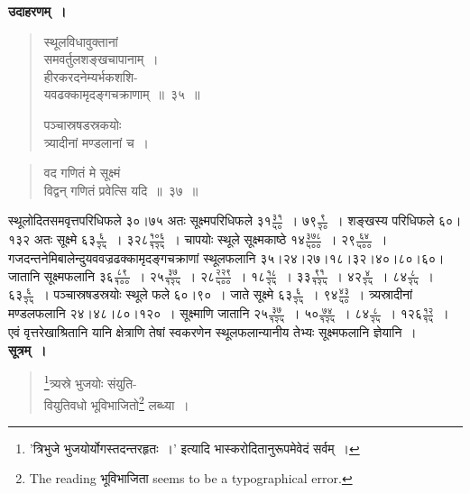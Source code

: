 \documentclass[11pt, openany]{book}
\begin{document}
 \textbf{उदाहरणम्~।} 
\begin{quote}
    \bqt 
     स्थूलविधावुक्तानां \\
     समवर्तुलशङ्खचापानाम्~।\\
हीरकरदनेम्यर्भकशशि-\\
यवढक्कामृदङ्गचक्राणाम्~॥~३५~॥ 
\vspace{2mm}

 पञ्चास्रषडस्रकयोः \\
 त्र्यादीनां मण्डलानां च~।
\end{quote}

\newpage%
\begin{quote}
    \bqt 
वद गणितं मे सूक्ष्मं \\
विद्वन् गणितं प्रवेत्सि यदि~॥~३७~॥ 
\end{quote}

स्थूलोदितसमवृत्तपरिधिफले ३०।७५ अतः सूक्ष्मपरिधिफले $\mbox{३१}\frac{\mbox{३१}}{\mbox{५०}}$~। 
$\mbox{७९}\frac{\mbox{९}}{\mbox{२०}}$~। शङ्खस्य परिधिफले ६०।१३२ अतः
सूक्ष्मे $\mbox{६३}\frac{\mbox{६}}{\mbox{२५}}$~। 
$\mbox{३२८}\frac{\mbox{१०६}}{\mbox{१२५}}$~। चापयोः स्थूले सूक्ष्मकाष्ठे $\mbox{१४}\frac{\mbox{३७८}}{\mbox{५००}}$~। $\mbox{२९}\frac{\mbox{६४}}{\mbox{५००}}$~। गजदन्तनेमिबालेन्दुयववज्रढक्कामृदङ्गचक्राणां स्थूलफलानि ३५।२४।२७।१८।३२।४०।८०।६०। जातानि सूक्ष्मफलानि $\mbox{३६}\frac{\mbox{८९}}{\mbox{१००}}$~। $\mbox{२५}\frac{\mbox{३७}}{\mbox{१२५}}$~। $\mbox{२८}\frac{\mbox{२२९}}{\mbox{५००}}$~। $\mbox{१८}\frac{\mbox{१८}}{\mbox{२५}}$~।
$\mbox{३३}\frac{\mbox{९१}}{\mbox{१२५}}$~। $\mbox{४२}\frac{\mbox{४}}{\mbox{२५}}$~। $\mbox{८४}\frac{\mbox{८}}{\mbox{२५}}$~। $\mbox{६३}\frac{\mbox{६}}{\mbox{२५}}$~।
पञ्चास्रषडस्रयोः स्थूले फले ६०।९०~। जाते सूक्ष्मे $\mbox{६३}\frac{\mbox{६}}{\mbox{२५}}$~। $\mbox{९४}\frac{\mbox{४३}}{\mbox{५०}}$~।
त्र्यस्रादीनां मण्डलफलानि २४।४८।८०।१२०~। सूक्ष्माणि जातानि $\mbox{२५}\frac{\mbox{३७}}{\mbox{१२५}}$~।
$\mbox{५०}\frac{\mbox{७४}}{\mbox{१२५}}$~। $\mbox{८४}\frac{\mbox{८}}{\mbox{२५}}$~। $\mbox{१२६}\frac{\mbox{१२}}{\mbox{१५}}$~। एवं वृत्तरेखाश्रितानि यानि क्षेत्राणि तेषां स्वकरणेन स्थूलफलान्यानीय
तेभ्यः सूक्ष्मफलानि ज्ञेयानि~।\\

\setcounter{footnote}{0}
 \textbf{सूत्रम्~।} 
\begin{quote}
    \bs 
 \footnote{'{\color{violet}त्रिभुजे भुजयोर्योगस्तदन्तरहृतः~।}' इत्यादि {\color{violet}भास्करो}दितानुरूपमेवेदं सर्वम्~।}त्र्यस्रे भुजयोः संयुति-\\
 वियुतिवधो भूविभाजितो\footnote{The reading भूविभाजिता seems to be a typographical error.} लब्ध्या~। 
\end{quote}
\end{document}

